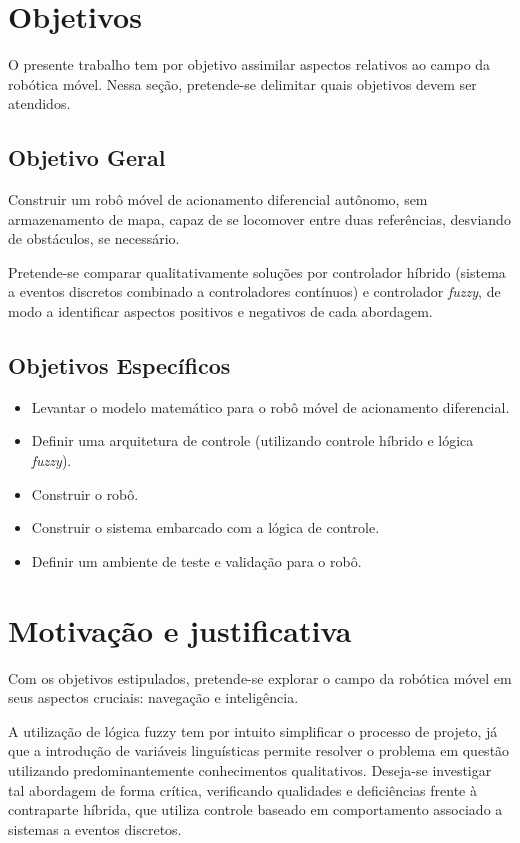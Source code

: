 \section{Objetivos}

O presente trabalho tem por objetivo assimilar aspectos relativos ao campo da
robótica móvel. Nessa seção, pretende-se delimitar quais objetivos devem ser
atendidos.

	\subsection{Objetivo Geral}
	
	Construir um robô móvel de acionamento diferencial autônomo, sem
	armazenamento de mapa, capaz de se locomover entre duas referências, desviando
	de obstáculos, se necessário.
	
	Pretende-se comparar qualitativamente soluções por controlador híbrido
	(sistema a eventos discretos combinado a controladores contínuos) e controlador
	\textit{fuzzy}, de modo a identificar aspectos positivos e negativos de cada
	abordagem.
 	
	\subsection{Objetivos Específicos}
 
	\begin{itemize}
	  \item Levantar o modelo matemático para o robô móvel de acionamento
	  diferencial.
	  \item Definir uma arquitetura de controle (utilizando controle híbrido e
	  lógica \textit{fuzzy}).
	  \item Construir o robô. 
	  \item Construir o sistema embarcado com a lógica de controle.
	  \item Definir um ambiente de teste e validação para o robô. 
	\end{itemize}
	
\section{Motivação e justificativa}

Com os objetivos estipulados, pretende-se explorar o campo da robótica móvel em
seus aspectos cruciais: navegação e inteligência.

A utilização de lógica fuzzy tem por intuito simplificar o processo de
projeto, já que a introdução de variáveis linguísticas permite
resolver o problema em questão utilizando predominantemente conhecimentos
qualitativos. Deseja-se investigar tal abordagem de forma crítica, verificando
qualidades e deficiências frente à contraparte híbrida, que utiliza controle
baseado em comportamento associado a sistemas a eventos discretos.

